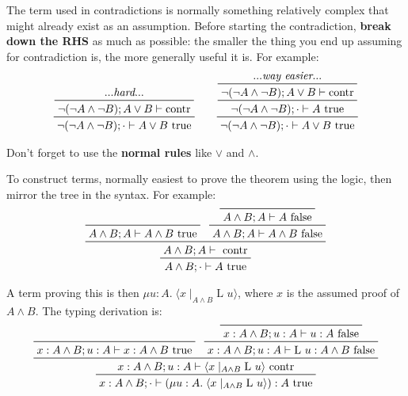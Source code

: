 \documentclass[11pt]{article}
\begin{document}
{{        The term used in contradictions is normally something relatively complex that might already exist as an
        assumption. Before starting the contradiction, \textbf{break down the RHS} as much as possible: the smaller the
        thing you end up assuming for contradiction is, the more generally useful it is. For example:
        \begin{gather*}
        \prftree[r]{}
        {
            \prftree[r]{}
            {...\textit{hard}...}
            {\neg(\neg A \wedge \neg B);A \vee B \vdash \text{contr}}
        }
        {\neg(\neg A \wedge \neg B);\cdot \vdash A \vee B\text{ true}}
        \qquad
        \prftree[r]{}
        {
            \prftree[r]{}
            {
                \prftree[r]{}
                {...\textit{way easier}...}
                {\neg(\neg A \wedge \neg B);A \vee B \vdash \text{contr}}
            }
            {\neg(\neg A \wedge \neg B);\cdot \vdash A\text{ true}}
        }
        {\neg(\neg A \wedge \neg B);\cdot \vdash A \vee B\text{ true}}
        \end{gather*}

        Don't forget to use the \textbf{normal rules} like \(\vee\) and \(\wedge\).

        To construct terms, normally easiest to prove the theorem using the logic, then mirror the tree in the syntax.
        For example:
        \begin{equation*}
        \prftree[r]{}
        {
            \prftree[r]{}
            {
                \prfaxiom{A \wedge B;A\vdash A\wedge B\text{ true}}
            }
            {
                \prftree[r]{}
                {
                    \prfaxiom{A \wedge B;A\vdash A\text{ false}}
                }
                {A \wedge B;A\vdash A\wedge B\text{ false}}
            }
            {A \wedge B;A\vdash \text{ contr}}
        }
        { A \wedge B;\cdot \vdash A\text{ true}}
        \end{equation*}

        A term proving this is then \(\mu u:A.\;\langle x \mid_{A \wedge B} \text{L }u \rangle\), where \(x\) is the
        assumed proof of \(A \wedge B\). The typing derivation is:
        \begin{equation*}
        \prftree[r]{}
        {
            \prftree[r]{}
            {
                \prfaxiom{x:A \wedge B;u:A\vdash x: A\wedge B\text{ true}}
            }
            {
                \prftree[r]{}
                {
                    \prfaxiom{x:A \wedge B;u:A\vdash u:A\text{ false}}
                }
                {x:A \wedge B;u:A\vdash \text{L }u : A\wedge B\text{ false}}
            }
            {x:A \wedge B;u:A\vdash \langle x \mid_{A \wedge B} \text{L }u \rangle \text{ contr}}
        }
        {x:A \wedge B;\cdot \vdash (\mu u:A.\;\langle x \mid_{A \wedge B} \text{L }u \rangle) : A\text{ true}}
        \end{equation*}
    }
}
\end{document}
